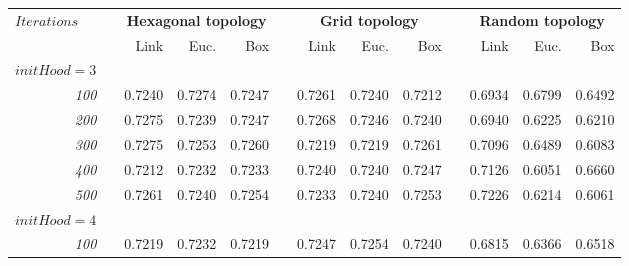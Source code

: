 \documentclass[a4paper, 10pt]{article}
\begin{document}
  \begin{figure}[h]
    \centering
    \hfill
    \begin{tabular}{@{}rcrrrcrrrcrrr@{}}
      \toprule
      \multicolumn{1}{l}{\multirow{2}{*}{$Iterations$}} & \phantom{a} &%
        \multicolumn{3}{c}{\textbf{Hexagonal topology}} & \phantom{a} &
        \multicolumn{3}{c}{\textbf{Grid topology}}      & \phantom{a} &
        \multicolumn{3}{c}{\textbf{Random topology}} \\
      \cmidrule{3-5} \cmidrule{7-9} \cmidrule{11-13}
      && Link & Euc. & Box && Link & Euc. & Box && Link & Euc. & Box  \\
      \midrule
      $initHood = 3$ \\
      \emph{100}  &&  0.7240  &  0.7274  &  0.7247  &&  0.7261  &  0.7240  &  0.7212  &&  0.6934  &  0.6799  &  0.6492 \\
      \emph{200}  &&  0.7275  &  0.7239  &  0.7247  &&  0.7268  &  0.7246  &  0.7240  &&  0.6940  &  0.6225  &  0.6210 \\
      \emph{300}  &&  0.7275  &  0.7253  &  0.7260  &&  0.7219  &  0.7219  &  0.7261  &&  0.7096  &  0.6489  &  0.6083 \\
      \emph{400}  &&  0.7212  &  0.7232  &  0.7233  &&  0.7240  &  0.7240  &  0.7247  &&  0.7126  &  0.6051  &  0.6660 \\
      \emph{500}  &&  0.7261  &  0.7240  &  0.7254  &&  0.7233  &  0.7240  &  0.7253  &&  0.7226  &  0.6214  &  0.6061 \\
      $initHood = 4$ \\
      \emph{100}  &&  0.7219  &  0.7232  &  0.7219  &&  0.7247  &  0.7254  &  0.7240  &&  0.6815  &  0.6366  &  0.6518 \\

\end{tabular}
\end{figure}
\end{document}

